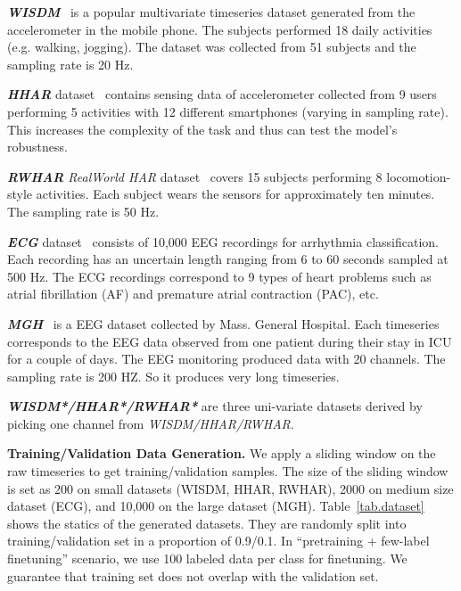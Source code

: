 \begin{compactitem}
\item
\textit{\textbf{WISDM}}~\cite{weiss2019smartphone} is a popular multivariate timeseries dataset generated from the accelerometer in the mobile phone.
The subjects performed 18 daily activities (e.g. walking, jogging). The dataset was collected from 51 subjects and the sampling rate is 20 Hz.


\item
\textit{\textbf{HHAR}} dataset~\cite{stisen2015smart} contains sensing data of accelerometer collected
from 9 users performing 5 activities with 12 different smartphones (varying in sampling rate). This increases the complexity of the task and thus can test the model’s robustness.

\item
{\textit{\textbf{RWHAR} RealWorld HAR}} dataset~\cite{sztyler2016body} covers 15 subjects performing 8 locomotion-style activities. Each subject wears the sensors for approximately ten minutes. The sampling rate is 50 Hz.

\item
\textit{\textbf{ECG}} dataset~\cite{liu2018open} consists
of 10,000 EEG recordings for arrhythmia classification. Each recording has an uncertain length ranging from 6 to 60 seconds sampled at 500 Hz. The ECG recordings correspond to 9 types of heart problems such as atrial fibrillation (AF) and premature atrial contraction (PAC), etc. 

\item
{\textit{\textbf{MGH}}}~\cite{DBLP:journals/pvldb/CaoTAJYLGSBSCWM19} is a EEG dataset collected by Mass. General Hospital. Each timeseries corresponds to the EEG data observed from one patient during their stay in ICU for a couple of days. The EEG monitoring produced data with 20 channels. The sampling rate is 200 HZ. So it produces very long timeseries.

\item
{\textit{\textbf{WISDM*/HHAR*/RWHAR*}}}
are three uni-variate datasets derived by picking one channel from \textit{WISDM/HHAR/RWHAR}.

\end{compactitem}


\noindent\textbf{Training/Validation Data Generation.}
We apply a sliding window on the raw timeseries to get training/validation samples. 
The size of the sliding window is set as 200 on small datasets (WISDM, HHAR, RWHAR), 2000 on medium size dataset (ECG), and 10,000 on the large dataset (MGH). Table~\ref{tab.dataset} shows the statics of the generated datasets. They are randomly split into training/validation set in a proportion of 0.9/0.1. 
In ``pretraining + few-label finetuning'' scenario, we use 100 labeled data per class for finetuning. We guarantee that training set does not overlap with the validation set.

